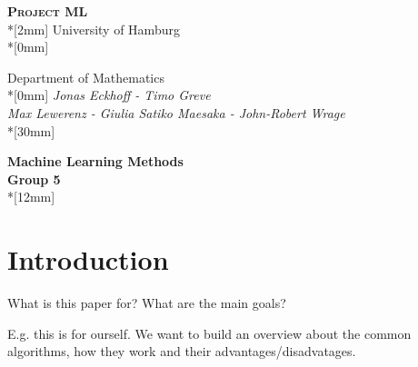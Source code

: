 \documentclass[a4paper,titlepage]{article}
\numberwithin{equation}{section} %
\begin{document}
\begin{titlepage}
\begin{center}                     
        {\Large\scshape \textbf{Project ML}}\\*[2mm]
				{\large University of Hamburg}\\*[0mm]

				{\large Department of Mathematics}\\*[0mm]
				{\large \emph{Jonas Eckhoff - Timo Greve\\ 
Max Lewerenz - Giulia Satiko Maesaka - John-Robert Wrage}}\\*[30mm]
				

        {\bf \LARGE Machine Learning Methods
         \\ Group 5}\\*[12mm]

\end{center}  

\end{titlepage}
\newpage


\setcounter{page}{2}

\tableofcontents
\newpage

\listoffigures
\newpage

\newpage


\setcounter{page}{1}
\section{Introduction}

What is this paper for?
What are the main goals?

E.g.
this is for ourself. We want to build an overview about the common algorithms, how they work and their advantages/disadvatages.

\newpage

\end{document}
